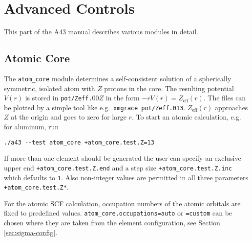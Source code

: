 \documentclass[oribibl]{llncs}
\newcommand{\um}[1]{_{\mathrm{#1}}}
\newcommand{\ttt}[1]{\texttt{#1}}
\newcommand{\codename}{A43}
\begin{document}
\newpage

\section{Advanced Controls} \label{sec:advanced-controls}
%
This part of the \codename{} manual describes
various modules in detail.


\subsection{Atomic Core} \label{sec:atom-core}
%
The \ttt{atom\_core} module determines a self-consistent solution
of a spherically symmetric, isolated atom with $Z$ protons in the core.
The resulting potential $V(r)$ is stored in \ttt{pot/Zeff.}$00Z$
in the form $-rV(r) = Z\um{eff}(r)$.
The files can be plotted by a simple tool like e.g.~\ttt{xmgrace pot/Zeff.013}.
$Z\um{eff}(r)$ approaches $Z$ at the origin and goes to zero for large $r$.
To start an atomic calculation, e.g. for aluminum, run
\begin{verbatim}
./a43 --test atom_core +atom_core.test.Z=13
\end{verbatim}
If more than one element should be generated
the user can specify an exclusive upper end \ttt{+atom\_core.test.Z.end} 
and a step size \ttt{+atom\_core.test.Z.inc} which defaults to \ttt{1}.
Also non-integer values are permitted in all three parameters \ttt{+atom\_core.test.Z*}.
%

\noindent
For the atomic \ac{SCF} calculation, occupation numbers of the atomic orbitals are fixed
to predefined values. \ttt{atom\_core.occupations=auto} or \ttt{=custom} can be chosen
where they are taken from the element configuration, see Section \ref{sec:sigma-config}.
\end{document}
